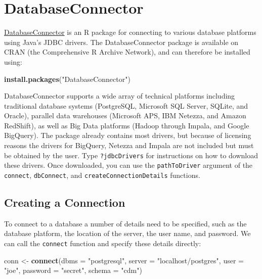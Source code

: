 \documentclass[11pt]{book}
\newenvironment{Shaded}{\begin{snugshade}}{\end{snugshade}}
\newcommand{\KeywordTok}[1]{\textcolor[rgb]{0.13,0.29,0.53}{\textbf{#1}}}
\newcommand{\DataTypeTok}[1]{\textcolor[rgb]{0.13,0.29,0.53}{#1}}
\newcommand{\StringTok}[1]{\textcolor[rgb]{0.31,0.60,0.02}{#1}}
\newcommand{\NormalTok}[1]{#1}
\theoremstyle{definition}
\theoremstyle{definition}
\theoremstyle{definition}
\theoremstyle{remark}
\begin{document}
\hypertarget{DatabaseConnector}{\section{DatabaseConnector}\label{DatabaseConnector}}

\href{https://ohdsi.github.io/DatabaseConnector/}{DatabaseConnector} is
an R package for connecting to various database platforms using Java's
JDBC drivers. The DatabaseConnector package is available on CRAN (the
Comprehensive R Archive Network), and can therefore be installed using:

\begin{Shaded}
\begin{Highlighting}[]
\KeywordTok{install.packages}\NormalTok{(}\StringTok{"DatabaseConnector"}\NormalTok{)}
\end{Highlighting}
\end{Shaded}

DatabaseConnector supports a wide array of technical platforms including
traditional database systems (PostgreSQL, Microsoft SQL Server, SQLite,
and Oracle), parallel data warehouses (Microsoft APS, IBM Netezza, and
Amazon RedShift), as well as Big Data platforms (Hadoop through Impala,
and Google BigQuery). The package already contains most drivers, but
because of licensing reasons the drivers for BigQuery, Netezza and
Impala are not included but must be obtained by the user. Type
\texttt{?jdbcDrivers} for instructions on how to download these drivers.
Once downloaded, you can use the \texttt{pathToDriver} argument of the
\texttt{connect}, \texttt{dbConnect}, and
\texttt{createConnectionDetails} functions.

\subsection{Creating a Connection}\label{creating-a-connection}

To connect to a database a number of details need to be specified, such
as the database platform, the location of the server, the user name, and
password. We can call the \texttt{connect} function and specify these
details directly: 

\begin{Shaded}
\begin{Highlighting}[]
\NormalTok{conn <-}\StringTok{ }\KeywordTok{connect}\NormalTok{(}\DataTypeTok{dbms =} \StringTok{"postgresql"}\NormalTok{,}
                \DataTypeTok{server =} \StringTok{"localhost/postgres"}\NormalTok{,}
                \DataTypeTok{user =} \StringTok{"joe"}\NormalTok{,}
                \DataTypeTok{password =} \StringTok{"secret"}\NormalTok{,}
                \DataTypeTok{schema =} \StringTok{"cdm"}\NormalTok{)}
\end{Highlighting}
\end{Shaded}
\end{document}
